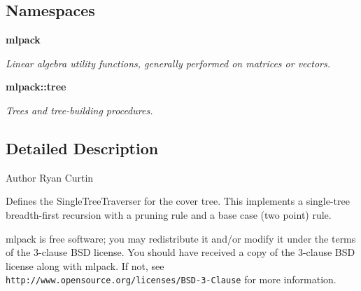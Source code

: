 \subsection*{Namespaces}
\begin{DoxyCompactItemize}
\item 
 \textbf{ mlpack}
\begin{DoxyCompactList}\small\item\em Linear algebra utility functions, generally performed on matrices or vectors. \end{DoxyCompactList}\item 
 \textbf{ mlpack\+::tree}
\begin{DoxyCompactList}\small\item\em Trees and tree-\/building procedures. \end{DoxyCompactList}\end{DoxyCompactItemize}


\subsection{Detailed Description}
\begin{DoxyAuthor}{Author}
Ryan Curtin
\end{DoxyAuthor}
Defines the Single\+Tree\+Traverser for the cover tree. This implements a single-\/tree breadth-\/first recursion with a pruning rule and a base case (two point) rule.

mlpack is free software; you may redistribute it and/or modify it under the terms of the 3-\/clause B\+SD license. You should have received a copy of the 3-\/clause B\+SD license along with mlpack. If not, see {\tt http\+://www.\+opensource.\+org/licenses/\+B\+S\+D-\/3-\/\+Clause} for more information. 